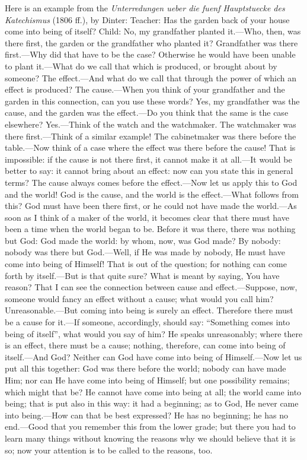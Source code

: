 Here is an example from the \emph{Unterredungen ueber die fuenf Hauptstuecke des Katechismus} (1806 ff.), by Dinter: Teacher: Has the garden back of your house come into being of itself? Child: No, my grandfather planted it.—Who, then, was there first, the garden or the grandfather who planted it? Grandfather was there first.—Why did that have to be the case? Otherwise he would have been unable to plant it.—What do we call that which is produced, or brought about by someone? The effect.—And what do we call that through the power of which an effect is produced? The cause.—When you think of your grandfather and the garden in this connection, can you use these words? Yes, my grandfather was the cause, and the garden was the effect.—Do you think that the same is the case elsewhere? Yes.—Think of the watch and the watchmaker. The watchmaker was there first.—Think of a similar example! The cabinetmaker was there before the table.—Now think of a case where the effect was there before the cause! That is impossible: if the cause is not there first, it cannot make it at all.—It would be better to say: it cannot bring about an effect: now can you state this in general terms? The cause always comes before the effect.—Now let us apply this to God and the world! God is the cause, and the world is the effect.—What follows from this? God must have been there first, or he could not have made the world.—As soon as I think of a maker of the world, it becomes clear that there must have been a time when the world began to be. Before it was there, there was nothing but God: God made the world: by whom, now, was God made? By nobody: nobody was there but God.—Well, if He was made by nobody, He must have come into being of Himself! That is out of the question; for nothing can come forth by itself.—But is that quite sure? What is meant by saying, You have reason? That I can see the connection between
cause and effect.—Suppose, now, someone would fancy an effect without a cause; what would you call him? Unreasonable.—But coming into being is surely an effect. Therefore there must be a cause for it.—If someone, accordingly, should say: “Something comes into being of itself”, what would you say of him? He speaks unreasonably; where there is an effect, there must be a cause; nothing, therefore, can come into being of itself.—And God? Neither can God have come into being of Himself.—Now let us put all this together: God was there before the world; nobody can have made Him; nor can He have come into being of Himself; but one possibility remains; which might that be? He cannot have come into being at all; the world came into being; that is put also in this way: it had a beginning; as to God, He never came into being.—How can that be best expressed? He has no beginning; he has no end.—Good that you remember this from the lower grade; but there you had to learn many things without knowing the reasons why we should believe that it is so; now your attention is to be called to the reasons, too.

